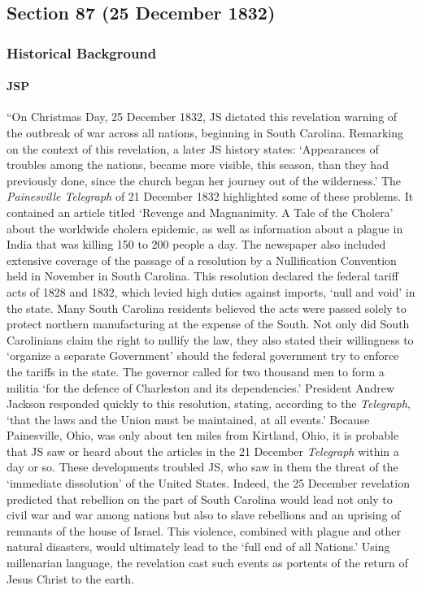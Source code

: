 \subsection{Section 87 (25 December 1832)}
	\label{DC87}
	
	\subsubsection{Historical Background}
		\label{DC87-HB}
		
		\paragraph{JSP}
		
			``On Christmas Day, 25 December 1832, JS dictated this revelation warning of the outbreak of war across all nations, beginning in South Carolina. Remarking on the context of this revelation, a later JS history states: `Appearances of troubles among the nations, became more visible, this season, than they had previously done, since the church began her journey out of the wilderness.' The \textit{Painesville Telegraph} of 21 December 1832 highlighted some of these problems. It contained an article titled `Revenge and Magnanimity. A Tale of the Cholera' about the worldwide cholera epidemic, as well as information about a plague in India that was killing 150 to 200 people a day. The newspaper also included extensive coverage of the passage of a resolution by a Nullification Convention held in November in South Carolina. This resolution declared the federal tariff acts of 1828 and 1832, which levied high duties against imports, `null and void' in the state. Many South Carolina residents believed the acts were passed solely to protect northern manufacturing at the expense of the South. Not only did South Carolinians claim the right to nullify the law, they also stated their willingness to `organize a separate Government' should the federal government try to enforce the tariffs in the state. The governor called for two thousand men to form a militia `for the defence of Charleston and its dependencies.' President Andrew Jackson responded quickly to this resolution, stating, according to the \textit{Telegraph}, `that the laws and the Union must be maintained, at all events.' Because Painesville, Ohio, was only about ten miles from Kirtland, Ohio, it is probable that JS saw or heard about the articles in the 21 December \textit{Telegraph} within a day or so. These developments troubled JS, who saw in them the threat of the `immediate dissolution' of the United States. Indeed, the 25 December revelation predicted that rebellion on the part of South Carolina would lead not only to civil war and war among nations but also to slave rebellions and an uprising of remnants of the house of Israel. This violence, combined with plague and other natural disasters, would ultimately lead to the `full end of all Nations.' Using millenarian language, the revelation cast such events as portents of the return of Jesus Christ to the earth.%
